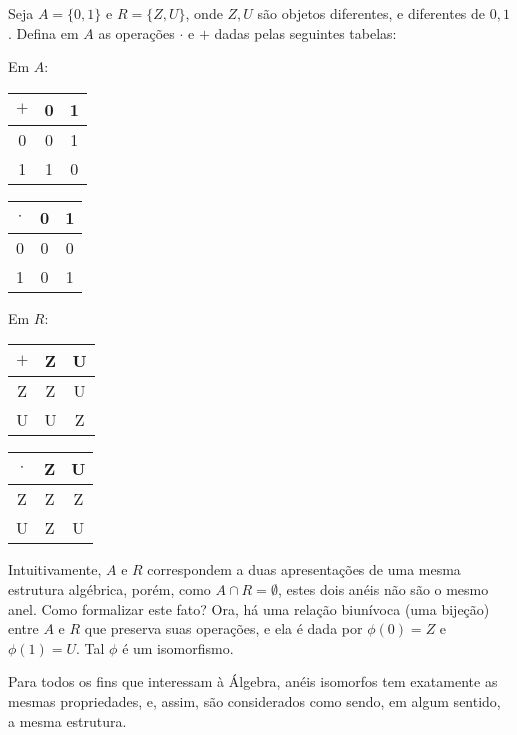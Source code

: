 \begin{exemplo}
Seja $A=\{0, 1\}$ e $R=\{Z, U\}$, onde $Z, U$ são objetos diferentes, e diferentes de $0, 1$. Defina em $A$ as operações $\cdot$ e $+$ dadas pelas seguintes tabelas:

Em $A$:
\begin{multicols}{2}\centering
    \begin{tabular}{c|cc}
        $+$ & 0 & 1 \\ \hline
        0 & 0 & 1 \\
        1 & 1 & 0 \\
    \end{tabular}

    \begin{tabular}{c|cc}
        $\cdot$ & 0 & 1 \\ \hline
        0 & 0 & 0 \\
        1 & 0 & 1 \\
    \end{tabular}
\end{multicols}

Em $R$:
\begin{multicols}{2}\centering
    \begin{tabular}{c|cc}
        $+$ & Z & U \\ \hline
        Z & Z & U \\
        U & U & Z \\
    \end{tabular}

    \begin{tabular}{c|cc}
        $\cdot$ & Z & U \\ \hline
        Z & Z & Z \\
        U & Z & U \\
    \end{tabular}
\end{multicols}

Intuitivamente, $A$ e $R$ correspondem a duas apresentações de uma mesma estrutura algébrica, porém, como $A\cap R=\emptyset$, estes dois anéis não são o mesmo anel.
Como formalizar este fato?
Ora, há uma relação biunívoca (uma bijeção) entre $A$ e $R$ que preserva suas operações, e ela é dada por $\phi(0)=Z$ e $\phi(1)=U$.
Tal $\phi$ é um isomorfismo.
\end{exemplo}

Para todos os fins que interessam à Álgebra, anéis isomorfos tem exatamente as mesmas propriedades, e, assim, são considerados como sendo, em algum sentido, a mesma estrutura.

